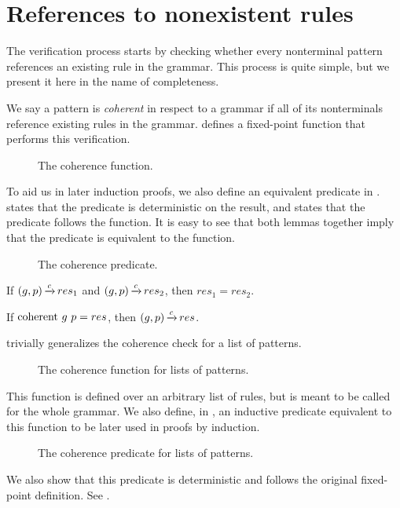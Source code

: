 \section{References to nonexistent rules}
\label{section:coherent}

The verification process
starts by checking whether
every nonterminal pattern references
an existing rule in the grammar.
This process is quite simple,
but we present it here in the name of completeness.

We say a pattern is
\emph{coherent} in respect to a grammar
if all of its nonterminals reference existing rules in the grammar.
defines a fixed-point function
that performs this verification.
\begin{figure}
    \centering
    
    \caption{The coherence function.}
    \label{fig:coherentfunc}
\end{figure}
To aid us in later induction proofs,
we also define an equivalent predicate in .
 states
that the predicate is deterministic on the result,
and  states that
the predicate follows the function.
It is easy to see that
both lemmas together imply that the
predicate is equivalent to the function.

\begin{figure}
    
    \caption{The coherence predicate.}
    \label{fig:coherent}
\end{figure}


\begin{lemma}
    \label{lemma:coherent-deterministic}
    If $(g,p) \operatorname{\xrightarrow{\mathit{c}}} res_1$ and $(g,p) \operatorname{\xrightarrow{\mathit{c}}} res_2$,
    then $res_1 = res_2$.
\end{lemma}

\begin{lemma}
    \label{lemma:coherent-follows}
    If $\text{coherent}{}\ g\ p = res$, then $(g,p) \operatorname{\xrightarrow{\mathit{c}}} res$.
\end{lemma}

 trivially generalizes the coherence check for a list of patterns.
\begin{figure}
    \centering
    
    \caption{The coherence function for lists of patterns.}
    \label{fig:lcoherent-function}
\end{figure}
This function is defined over an arbitrary list of rules,
but is meant to be called for the whole grammar.
We also define, in , an inductive predicate
equivalent to this function to be
later used in proofs by induction.
\begin{figure}
    \centering
    
    \caption{The coherence predicate for lists of patterns.}
    \label{fig:lcoherent}
\end{figure}
We also show that this predicate
is deterministic and follows
the original fixed-point definition.
See .

